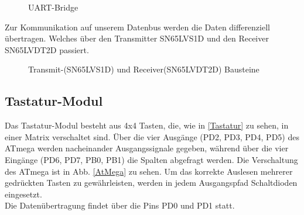 \begin{figure}[H]
    \centering    
    \caption{UART-Bridge}
    \label{USB}
\end{figure}

Zur Kommunikation auf unserem Datenbus werden die Daten differenziell übertragen. Welches über den Transmitter SN65LVS1D und den Receiver SN65LVDT2D passiert.

\begin{figure}[H]
    \centering    
    \caption{Transmit-(SN65LVS1D) und Receiver(SN65LVDT2D) Bausteine }
    \label{T_R_Bausteine}
\end{figure}

\subsection{Tastatur-Modul}
Das Tastatur-Modul besteht aus 4x4 Tasten, die, wie in \ref{Tastatur} zu sehen, in einer Matrix verschaltet sind. Über die vier Ausgänge (PD2, PD3, PD4, PD5) des  ATmega werden nacheinander 
Ausgangssignale gegeben, während über die vier Eingänge (PD6, PD7, PB0, PB1) die Spalten abgefragt werden. Die Verschaltung des ATmega ist in Abb. \ref{AtMega} zu sehen. Um das korrekte Auslesen mehrerer gedrückten Tasten zu gewährleisten, werden in jedem 
Ausgangspfad Schaltdioden eingesetzt. \\
Die Datenübertragung findet über die Pins PD0 und PD1 statt.


